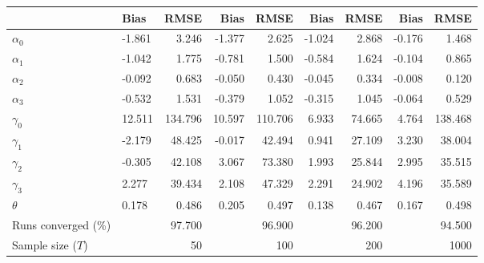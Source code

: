 
\begin{tabular}[t]{llrrrrrrr}
\toprule
  & Bias & RMSE & Bias & RMSE & Bias & RMSE & Bias & RMSE\\
\midrule
$\alpha_{0}$ & -1.861 & 3.246 & -1.377 & 2.625 & -1.024 & 2.868 & -0.176 & 1.468\\
$\alpha_{1}$ & -1.042 & 1.775 & -0.781 & 1.500 & -0.584 & 1.624 & -0.104 & 0.865\\
$\alpha_{2}$ & -0.092 & 0.683 & -0.050 & 0.430 & -0.045 & 0.334 & -0.008 & 0.120\\
$\alpha_{3}$ & -0.532 & 1.531 & -0.379 & 1.052 & -0.315 & 1.045 & -0.064 & 0.529\\
$\gamma_{0}$ & 12.511 & 134.796 & 10.597 & 110.706 & 6.933 & 74.665 & 4.764 & 138.468\\
$\gamma_{1}$ & -2.179 & 48.425 & -0.017 & 42.494 & 0.941 & 27.109 & 3.230 & 38.004\\
$\gamma_{2}$ & -0.305 & 42.108 & 3.067 & 73.380 & 1.993 & 25.844 & 2.995 & 35.515\\
$\gamma_{3}$ & 2.277 & 39.434 & 2.108 & 47.329 & 2.291 & 24.902 & 4.196 & 35.589\\
$\theta$ & 0.178 & 0.486 & 0.205 & 0.497 & 0.138 & 0.467 & 0.167 & 0.498\\
Runs converged (\%) &  & 97.700 &  & 96.900 &  & 96.200 &  & 94.500\\
Sample size ($T$) &  & 50 &  & 100 &  & 200 &  & 1000\\
\bottomrule
\end{tabular}
